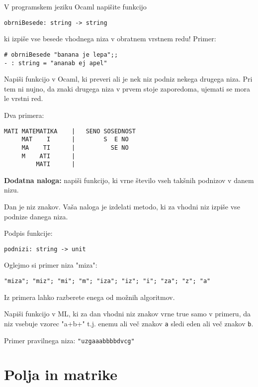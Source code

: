 \begin{ex}
V programskem jeziku Ocaml napi\v site funkcijo 
\begin{lstlisting}
obrniBesede: string -> string
\end{lstlisting}
ki izpi\v se vse besede vhodnega niza v obratnem vrstnem redu!
Primer:
\begin{lstlisting}
# obrniBesede "banana je lepa";;
- : string = "ananab ej apel"
\end{lstlisting}

\end{ex}
\begin{ex}
Napi\v si funkcijo v Ocaml, ki preveri ali je nek niz podniz nekega drugega niza. Pri tem ni nujno, da znaki drugega niza v prvem stoje zaporedoma, ujemati se mora le vrstni red.

Dva primera:                    
\begin{lstlisting}
MATI MATEMATIKA    |   SENO SOSEDNOST 
     MAT    I      |        S  E NO 
     MA    TI      |          SE NO 
     M    ATI      |
         MATI      |
\end{lstlisting}
\textbf{Dodatna naloga:} napi\v si funkcijo, ki vrne \v stevilo vseh tak\v snih podnizov v danem nizu.
\end{ex}
\begin{ex}
Dan je niz znakov. Va\v sa naloga je izdelati metodo, ki za vhodni niz izpi\v se vse podnize danega niza.

Podpis funkcije:
\begin{lstlisting}
podnizi: string -> unit 
\end{lstlisting}

Oglejmo si primer niza "miza":
\begin{lstlisting}
"miza"; "miz"; "mi"; "m"; "iza"; "iz"; "i"; "za"; "z"; "a" 
\end{lstlisting}

Iz primera lahko razberete enega od mo\v znih algoritmov.
\end{ex}
\begin{ex}
Napi\v si funkcijo v ML, ki za dan vhodni niz znakov vrne true samo v primeru, da niz vsebuje vzorec "a+b+" t.j. enemu ali ve\v c znakov \lstinline{a} sledi eden ali ve\v c znakov \lstinline{b}.

Primer pravilnega niza: \lstinline{"uzgaaabbbbdvcg"}

\end{ex}

\section{Polja in matrike}

